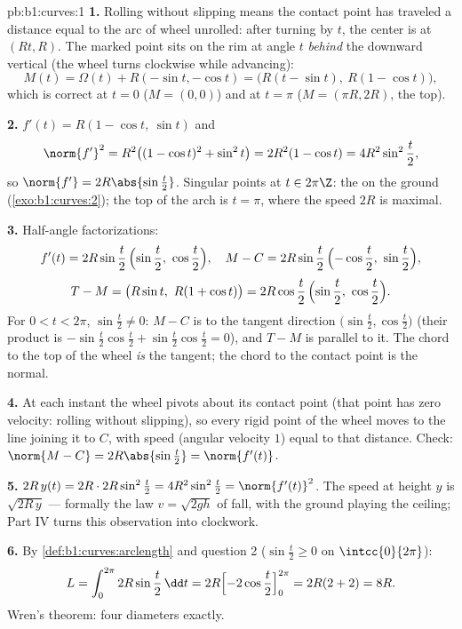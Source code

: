 \begin{solution}{pb:b1:curves:1}
\textbf{1.} Rolling without slipping means the contact point has
traveled a distance equal to the arc of wheel unrolled: after
turning by $t$, the center is at $(Rt, R)$. The marked point sits
on the rim at angle $t$ \emph{behind} the downward vertical
(the wheel turns clockwise while advancing):
\[
M(t) = \Omega(t) + R(-\sin t, -\cos t)
= \bigl(R(t - \sin t),\ R(1 - \cos t)\bigr),
\]
which is correct at $t = 0$ ($M = (0,0)$) and at $t = \pi$ ($M =
(\pi R, 2R)$, the top).

\textbf{2.} $f'(t) = R(1 - \cos t,\ \sin t)$ and
\[
\norm{f'}^2 = R^2\bigl((1-\cos t)^2 + \sin^2 t\bigr)
= 2R^2(1 - \cos t) = 4R^2\sin^2\frac t2 ,
\]
so $\norm{f'} = 2R\abs{\sin\frac t2}$. Singular points at $t \in
2\pi\Z$: the  on the ground (\cref{exo:b1:curves:2}); the
top of the arch is $t = \pi$, where the speed $2R$ is maximal.

\textbf{3.} Half-angle factorizations:
\[
f'(t) = 2R\sin\frac t2\,\Bigl(\sin\frac t2,\ \cos\frac t2\Bigr),
\quad
M - C = 2R\sin\frac t2\,\Bigl(-\cos\frac t2,\ \sin\frac t2\Bigr),
\]
\[
T - M = \bigl(R\sin t,\ R(1 + \cos t)\bigr)
= 2R\cos\frac t2\,\Bigl(\sin\frac t2,\ \cos\frac t2\Bigr).
\]
For $0 < t < 2\pi$, $\sin\frac t2 \neq 0$: $M - C$ is 
to the tangent direction $\bigl(\sin\frac t2, \cos\frac
t2\bigr)$ (their product is $-\sin\frac t2\cos\frac t2 +
\sin\frac t2\cos\frac t2 = 0$), and $T - M$ is parallel to it.
The chord to the top of the wheel \emph{is} the tangent; the
chord to the contact point is the normal.

\textbf{4.} At each instant the wheel pivots about its contact
point (that point has zero velocity: rolling without slipping),
so every rigid point of the wheel moves  to the line
joining it to $C$, with speed (angular velocity $1$) equal to
that distance. Check: $\norm{M - C} = 2R\abs{\sin\frac t2} =
\norm{f'(t)}$.

\textbf{5.} $2R\,y(t) = 2R\cdot 2R\sin^2\frac t2 =
4R^2\sin^2\frac t2 = \norm{f'(t)}^2$. The speed at height $y$ is
$\sqrt{2R\,y}$ --- formally the law $v = \sqrt{2gh}$ of 
fall, with the ground playing the ceiling; Part IV turns this
observation into clockwork.

\textbf{6.} By \cref{def:b1:curves:arclength} and question 2
($\sin\frac t2 \geq 0$ on $\intcc{0}{2\pi}$):
\[
L = \int_0^{2\pi} 2R\sin\frac t2\,\dd t
= 2R\Bigl[-2\cos\frac t2\Bigr]_0^{2\pi} = 2R(2 + 2) = 8R .
\]
Wren's theorem: four diameters exactly.


\end{solution}
